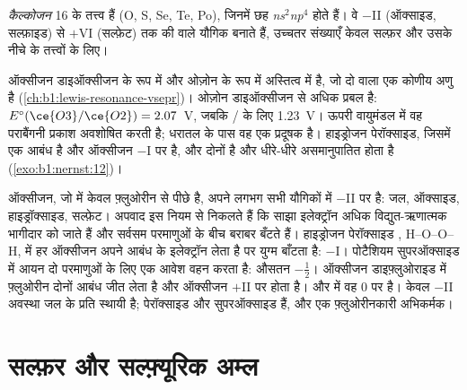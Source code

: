 \begin{definition}[कैल्कोजन]\label{def:b1:p-block-16-18:chalcogen}
\emph{कैल्कोजन}  16 के तत्त्व हैं
(O, S, Se, Te, Po), जिनमें छह  \textit{ns}$^2$\textit{np}$^4$ होते हैं।
वे $-$II (ऑक्साइड, सल्फ़ाइड) से $+$VI (सल्फ़ेट) तक की  वाले
यौगिक बनाते हैं, उच्चतर संख्याएँ केवल सल्फ़र और उसके नीचे के तत्त्वों के लिए।
\end{definition}

ऑक्सीजन डाइऑक्सीजन  के रूप में और ओज़ोन  के रूप में अस्तित्व में है, जो
दो  वाला एक कोणीय अणु है (\cref{ch:b1:lewis-resonance-vsepr})। ओज़ोन
डाइऑक्सीजन से अधिक प्रबल  है: $E^\circ(\ce{O3}/\ce{O2}) = 2.07$~V,
जबकि / के लिए 1.23~V। ऊपरी वायुमंडल में वह
पराबैंगनी प्रकाश अवशोषित करती है; धरातल के पास वह एक प्रदूषक है। हाइड्रोजन पेरॉक्साइड,
जिसमें एक  आबंध है और ऑक्सीजन $-$I पर है,  और  दोनों है
और धीरे-धीरे असमानुपातित होता है (\cref{exo:b1:nernst:12})।

\begin{example}[ऑक्सीजन की ऑक्सीकरण संख्याएँ]
ऑक्सीजन, जो  में केवल फ़्लुओरीन से पीछे है, अपने लगभग सभी यौगिकों में
$-$II पर है: जल, ऑक्साइड, हाइड्रॉक्साइड, सल्फ़ेट। अपवाद
इस नियम से निकलते हैं कि साझा इलेक्ट्रॉन अधिक विद्युत-ऋणात्मक भागीदार को जाते हैं
और सर्वसम परमाणुओं के बीच बराबर बँटते हैं।
हाइड्रोजन पेरॉक्साइड , H--O--O--H, में हर ऑक्सीजन अपने  आबंध के
इलेक्ट्रॉन लेता है पर  युग्म बाँटता है: $-$I। पोटैशियम
सुपरऑक्साइड  में आयन  दो परमाणुओं के लिए एक आवेश वहन करता है:
औसतन $-\frac12$। ऑक्सीजन डाइफ़्लुओराइड  में फ़्लुओरीन दोनों
आबंध जीत लेता है और ऑक्सीजन $+$II पर होता है।  और  में वह 0 पर है। केवल
$-$II अवस्था जल के प्रति स्थायी है; पेरॉक्साइड और सुपरऑक्साइड
 हैं, और  एक फ़्लुओरीनकारी अभिकर्मक।
\end{example}

\section{सल्फ़र और सल्फ़्यूरिक अम्ल}

